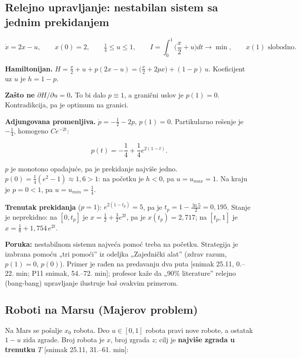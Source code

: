 \documentclass[11pt,a4paper,parskip=half,headsepline,numbers=noenddot]{scrartcl}
\DeclareRobustCommand{\izvor}[1]{{\small\color{izvorC}[#1]}}
\begin{document}
\subsection{Relejno upravljanje: nestabilan sistem sa jednim prekidanjem}

\[\dot x = 2x - u, \qquad x(0) = 2, \qquad \tfrac14 \le u \le 1, \qquad I = \int_0^1\Big(\frac x2 + u\Big)dt \to \min, \qquad x(1) \text{ slobodno.}\]

\textbf{Hamiltonijan.} \(H = \frac x2 + u + p(2x - u) = \big(\frac x2 + 2px\big) + (1 - p)\,u\). Koeficijent uz \(u\) je \(h = 1 - p\).

\textbf{Zašto ne \(\partial H/\partial u = 0\).} To bi dalo \(p \equiv 1\), a granični uslov je \(p(1) = 0\). Kontradikcija, pa je optimum na granici.

\textbf{Adjungovana promenljiva.} \(\dot p = -\frac12 - 2p\), \(p(1) = 0\). Partikularno rešenje je \(-\frac14\), homogeno \(Ce^{-2t}\):

\[p(t) = -\frac14 + \frac14e^{2(1 - t)} .\]

\(p\) je monotono opadajuće, pa je prekidanje najviše jedno. \(p(0) = \frac14(e^2 - 1) \approx 1{,}6 > 1\): na početku je \(h < 0\), pa \(u = u_{max} = 1\). Na kraju je \(p = 0 < 1\), pa \(u = u_{min} = \frac14\).

\textbf{Trenutak prekidanja} (\(p = 1\)): \(e^{2(1 - t_p)} = 5\), pa je \(t_p = 1 - \frac{\ln5}{2} = 0{,}195\). Stanje je neprekidno: na \([0, t_p]\) je \(x = \frac12 + \frac32e^{2t}\), pa je \(x(t_p) = 2{,}717\); na \([t_p, 1]\) je \(x = \frac18 + 1{,}754\,e^{2t}\).

\textbf{Poruka:} nestabilnom sistemu najveća pomoć treba na početku. Strategija je izabrana pomoću „tri pomoći'' iz odeljka „Zajednički alat'' (zdrav razum, \(p(1) = 0\), \(p(0)\)). Primer je rađen na predavanju dva puta \izvor{snimak 25.11, 0.--22. min; P11 snimak, 54.--72. min}; profesor kaže da „90\% literature'' relejno (bang-bang) upravljanje ilustruje baš ovakvim primerom.

\subsection{Roboti na Marsu (Majerov problem)}

Na Mars se pošalje \(x_0\) robota. Deo \(u \in [0, 1]\) robota pravi nove robote, a ostatak \(1 - u\) zida zgrade. Broj robota je \(x\), broj zgrada \(z\); cilj je \textbf{najviše zgrada u trenutku \(T\)} \izvor{snimak 25.11, 31.--61. min}:
\end{document}
